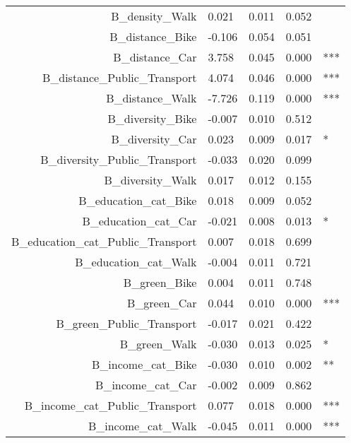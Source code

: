 \begin{table}
\begin{tabular}{rllll}
B\_density\_Walk                     &  0.021 &    0.011 &    0.052 &              \\
B\_distance\_Bike                    & -0.106 &    0.054 &    0.051 &              \\
B\_distance\_Car                     &  3.758 &    0.045 &    0.000 &          *** \\
B\_distance\_Public\_Transport       &  4.074 &    0.046 &    0.000 &          *** \\
B\_distance\_Walk                    & -7.726 &    0.119 &    0.000 &          *** \\
B\_diversity\_Bike                   & -0.007 &    0.010 &    0.512 &              \\
B\_diversity\_Car                    &  0.023 &    0.009 &    0.017 &            * \\
B\_diversity\_Public\_Transport      & -0.033 &    0.020 &    0.099 &              \\
B\_diversity\_Walk                   &  0.017 &    0.012 &    0.155 &              \\
B\_education\_cat\_Bike              &  0.018 &    0.009 &    0.052 &              \\
B\_education\_cat\_Car               & -0.021 &    0.008 &    0.013 &            * \\
B\_education\_cat\_Public\_Transport &  0.007 &    0.018 &    0.699 &              \\
B\_education\_cat\_Walk              & -0.004 &    0.011 &    0.721 &              \\
B\_green\_Bike                       &  0.004 &    0.011 &    0.748 &              \\
B\_green\_Car                        &  0.044 &    0.010 &    0.000 &          *** \\
B\_green\_Public\_Transport          & -0.017 &    0.021 &    0.422 &              \\
B\_green\_Walk                       & -0.030 &    0.013 &    0.025 &            * \\
B\_income\_cat\_Bike                 & -0.030 &    0.010 &    0.002 &           ** \\
B\_income\_cat\_Car                  & -0.002 &    0.009 &    0.862 &              \\
B\_income\_cat\_Public\_Transport    &  0.077 &    0.018 &    0.000 &          *** \\
B\_income\_cat\_Walk                 & -0.045 &    0.011 &    0.000 &          *** \\

\end{tabular}
\end{table}
